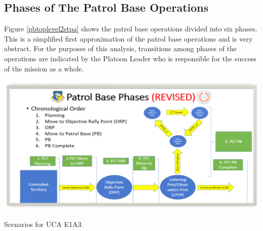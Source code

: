 \documentclass[../../main/main.tex]{subfiles}
\begin{document}
\subsection{Phases of The Patrol Base Operations}
Figure \ref{pbtoplevel2stpa} shows the patrol base operations divided into six phases.   This is a simplified first approximation of the patrol base operations and is very abstract.  For the purposes of this analysis, transitions among phases of the operations are indicated by the Platoon Leader who is responsible for the success of the mission as a whole.  

\begin{table}[ht!]
\begin{center}
\includegraphics[width=\linewidth]{../figures/pbtoplevel}
\caption{Scenarios for UCA E1A3.}
\label{pbtoplevel2stpa}
\end{center}
\end{table}
\clearpage
\end{document}
